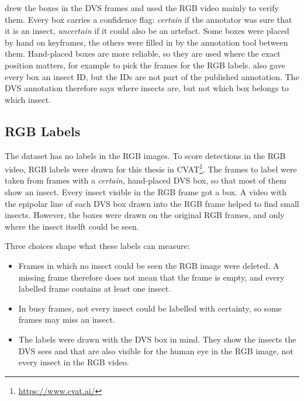 \textcite{gebauer_towards_2024} drew the boxes in the DVS frames and used the RGB video
mainly to verify them. Every box carries a confidence flag: \emph{certain} if the 
annotator was sure that it is an insect, \emph{uncertain} if it could also be an artefact.
Some boxes were placed by hand on keyframes, the others were filled in by the annotation 
tool between them. Hand-placed boxes are more reliable, so they are used where the exact 
position matters, for example to pick the frames for the RGB labels. 
\textcite{gebauer_towards_2024} also gave every box an insect ID, but the IDs are not part of the published annotation. The DVS annotation therefore says where insects are, but not which box belongs to which insect. 

\subsection{RGB Labels}
\label{sec:data-rgb-labels}

The dataset has no labels in the RGB images. To score detections in the RGB video, RGB 
labels were drawn for this thesis in CVAT\footnote{\url{https://www.cvat.ai/}}. The frames
to label were taken from frames with a \emph{certain}, hand-placed DVS box, so that most of 
them show an insect. Every insect visible in the RGB frame got a box. A video with the 
epipolar line of each DVS box drawn into the RGB frame helped to find small insects. 
However, the boxes were drawn on the original RGB frames, and only where the insect itselft could be seen.

Three choices shape what these labels can measure:
\begin{itemize}
    \item Frames in which no insect could be seen the RGB image were deleted. A missing 
    frame therefore does not mean that the frame is empty, and every labelled frame 
    contains at least one insect.
    \item In busy frames, not every insect could be labelled with certainty, so some frames 
    may miss an insect.
    \item The labels were drawn with the DVS box in mind. They show the insects the DVS
    sees and that are also visible for the human eye in the RGB image, not every insect in 
    the RGB video. 
\end{itemize}

